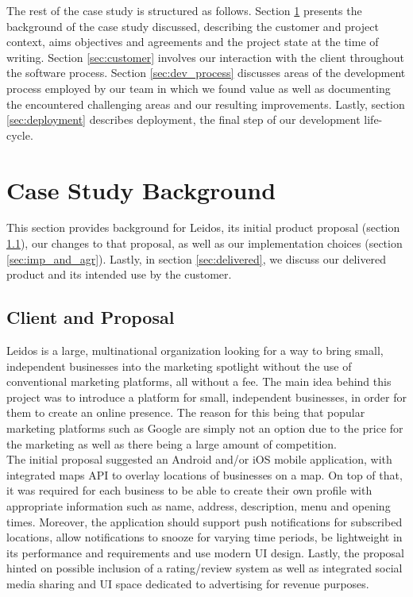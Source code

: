 \documentclass{l3proj}
\begin{document}
The rest of the case study is structured as follows.  Section
\ref{sec:background} presents the background of the case study
discussed, describing the customer and project context, aims
objectives and agreements and the project state at the time of writing.
Section \ref{sec:customer} involves our interaction with the client throughout the software process.
Section \ref{sec:dev_process} discusses areas of the development process employed by our team in which we found value as well as documenting the encountered challenging areas and our resulting improvements. Lastly, section \ref{sec:deployment} describes deployment, the final step of our development life-cycle. 

\section{Case Study Background}
\label{sec:background}
    This section provides background for Leidos, its initial product proposal (section \ref{sec:proposal}), our changes to that proposal, as well as our implementation choices (section \ref{sec:imp_and_agr}). Lastly, in section \ref{sec:delivered}, we discuss our delivered product and its intended use by the customer.
    
    \subsection{Client and Proposal}
    \label{sec:proposal}
        Leidos is a large, multinational organization looking for a way to bring small, independent businesses into the marketing spotlight without the use of conventional marketing platforms, all without a fee.
        \newline
        The main idea behind this project was to introduce a platform for small, independent businesses, in order for them to create an online presence. The reason for this being that popular marketing platforms such as Google are simply not an option due to the price for the marketing as well as there being a large amount of competition.\\
        \newline
        The initial proposal suggested an Android and/or iOS mobile application, with integrated maps API to overlay locations of businesses on a map. On top of that, it was required for each business to be able to create their own profile with appropriate information such as name, address, description, menu and opening times. Moreover, the application should support push notifications for subscribed locations, allow notifications to snooze for varying time periods, be lightweight in its performance and requirements and use modern UI design.
        Lastly, the proposal hinted on possible inclusion of a rating/review system as well as integrated social media sharing and UI space dedicated to advertising for revenue purposes.
\end{document}

